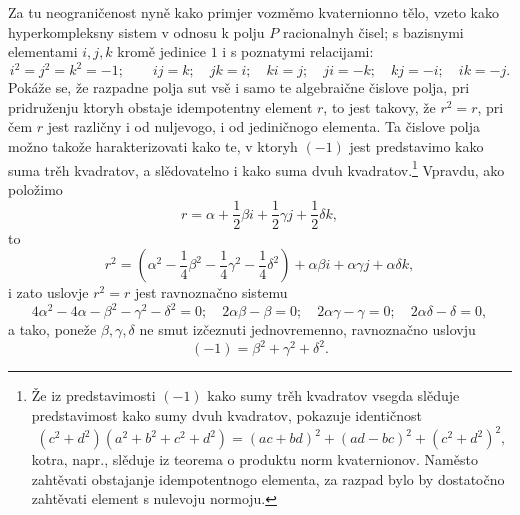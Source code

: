 \documentclass[11pt]{article}
\begin{document}
\noindent Za tu neograničenost nyně kako primjer vozměmo kvaternionno tělo, vzeto kako hyperkompleksny sistem v odnosu k polju $P$ racionalnyh čisel; s bazisnymi elementami $i,j,k$ kromě jedinice $1$ i s poznatymi relacijami:
\[
 i^2=j^2=k^2=-1;\qquad ij=k;\quad jk=i;\quad ki=j;\quad ji=-k;\quad kj=-i;\quad ik=-j.
\]
Pokáže se, že razpadne polja sut vsě i samo te algebraične čislove polja, pri pridruženju ktoryh obstaje idempotentny element $r$, to jest takovy, že $r^2=r$, pri čem $r$ jest različny i od nuljevogo, i od jediničnogo elementa. Ta čislove polja možno takože harakterizovati kako te, v ktoryh $(-1)$ jest predstavimo kako suma trěh kvadratov, a slědovatelno i kako suma dvuh kvadratov.\footnote{Že iz predstavimosti $(-1)$ kako sumy trěh kvadratov vsegda slěduje predstavimost kako sumy dvuh kvadratov, pokazuje identičnost
\[
(c^2+d^2)(a^2+b^2+c^2+d^2)=(ac+bd)^2+(ad-bc)^2+(c^2+d^2)^2,
\]
kotra, napr., slěduje iz teorema o produktu norm kvaternionov. Naměsto zahtěvati obstajanje idempotentnogo elementa, za razpad bylo by dostatočno zahtěvati element s nulevoju normoju.} Vpravdu, ako položimo
\[
        r=\alpha+\frac12\beta i+\frac12\gamma j+\frac12\delta k,
\]
to
\[
        r^2=\left(\alpha^2-\frac14\beta^2-\frac14\gamma^2-\frac14\delta^2\right)
          +\alpha\beta i+\alpha\gamma j+\alpha\delta k,
\]
i zato uslovje $r^2=r$ jest ravnoznačno sistemu
\[
4\alpha^2-4\alpha-\beta^2-\gamma^2-\delta^2=0;\quad
2\alpha\beta-\beta=0;\quad 2\alpha\gamma-\gamma=0;\quad 2\alpha\delta-\delta=0,
\]
a tako, poneže $\beta,\gamma,\delta$ ne smut izčeznuti jednovremenno, ravnoznačno uslovju
\[
        (-1)=\beta^2+\gamma^2+\delta^2.
\]
\end{document}
